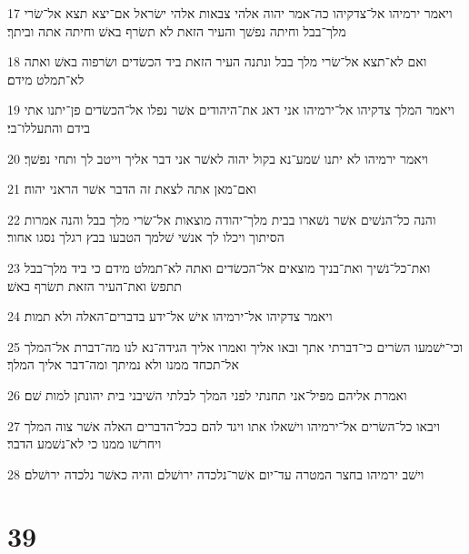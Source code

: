 \par 17 ויאמר ירמיהו אל־צדקיהו כה־אמר יהוה אלהי צבאות אלהי ישׂראל אם־יצא תצא אל־שׂרי מלך־בבל וחיתה נפשׁך והעיר הזאת לא תשׂרף באשׁ וחיתה אתה וביתך׃
\par 18 ואם לא־תצא אל־שׂרי מלך בבל ונתנה העיר הזאת ביד הכשׂדים ושׂרפוה באשׁ ואתה לא־תמלט מידם׃
\par 19 ויאמר המלך צדקיהו אל־ירמיהו אני דאג את־היהודים אשׁר נפלו אל־הכשׂדים פן־יתנו אתי בידם והתעללו־בי׃
\par 20 ויאמר ירמיהו לא יתנו שׁמע־נא בקול יהוה לאשׁר אני דבר אליך וייטב לך ותחי נפשׁך׃
\par 21 ואם־מאן אתה לצאת זה הדבר אשׁר הראני יהוה׃
\par 22 והנה כל־הנשׁים אשׁר נשׁארו בבית מלך־יהודה מוצאות אל־שׂרי מלך בבל והנה אמרות הסיתוך ויכלו לך אנשׁי שׁלמך הטבעו בבץ רגלך נסגו אחור׃
\par 23 ואת־כל־נשׁיך ואת־בניך מוצאים אל־הכשׂדים ואתה לא־תמלט מידם כי ביד מלך־בבל תתפשׂ ואת־העיר הזאת תשׂרף באשׁ׃
\par 24 ויאמר צדקיהו אל־ירמיהו אישׁ אל־ידע בדברים־האלה ולא תמות׃
\par 25 וכי־ישׁמעו השׂרים כי־דברתי אתך ובאו אליך ואמרו אליך הגידה־נא לנו מה־דברת אל־המלך אל־תכחד ממנו ולא נמיתך ומה־דבר אליך המלך׃
\par 26 ואמרת אליהם מפיל־אני תחנתי לפני המלך לבלתי השׁיבני בית יהונתן למות שׁם׃
\par 27 ויבאו כל־השׂרים אל־ירמיהו וישׁאלו אתו ויגד להם ככל־הדברים האלה אשׁר צוה המלך ויחרשׁו ממנו כי לא־נשׁמע הדבר׃
\par 28 וישׁב ירמיהו בחצר המטרה עד־יום אשׁר־נלכדה ירושׁלם והיה כאשׁר נלכדה ירושׁלם׃

\chapter{39}

